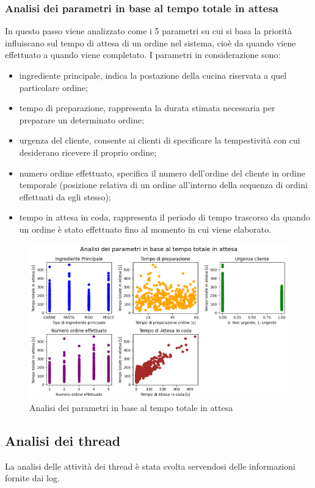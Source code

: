 \subsubsection{Analisi dei parametri in base al tempo totale in attesa}
In questo passo viene analizzato come i 5 parametri su cui si basa la priorità influiscano sul tempo di attesa di un ordine nel sistema, cioè da quando viene effettuato a quando viene completato. I parametri in considerazione sono:
\begin{itemize}
	\item ingrediente principale, indica la postazione della cucina riservata a quel particolare ordine;
	\item tempo di preparazione, rappresenta la durata stimata necessaria per preparare un determinato ordine;
	\item urgenza del cliente, consente ai clienti di specificare la tempestività con cui desiderano ricevere il proprio ordine;
	\item numero ordine effettuato, specifica il numero dell’ordine del cliente in ordine temporale (posizione relativa di un ordine all’interno della sequenza di ordini effettuati da egli stesso);
	\item tempo in attesa in coda, rappresenta il periodo di tempo trascorso da quando un ordine è stato effettuato fino al momento in cui viene elaborato.
\end{itemize}
\begin{figure}[H]
	\centering
	\includegraphics[scale=0.6]{iterazione3/images/analisi_parametri.png}
	\caption{Analisi dei parametri in base al tempo totale in attesa\label{fig:analisi_parametri}}
\end{figure}

\subsection{Analisi dei thread}
La analisi delle attività dei thread è stata svolta servendosi delle informazioni fornite dai log.

